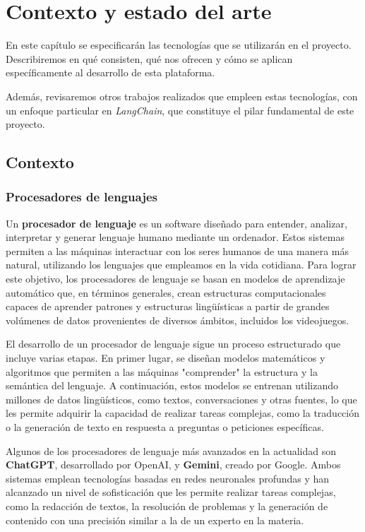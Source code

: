 
\chapter{Contexto y estado del arte }

En este capítulo se especificarán las tecnologías que se utilizarán en el proyecto. Describiremos en qué consisten, qué nos ofrecen y cómo se aplican específicamente al desarrollo de esta plataforma. 

Además, revisaremos otros trabajos realizados que empleen estas tecnologías, con un enfoque particular en \textit{LangChain}, que constituye el pilar fundamental de este proyecto.  

\newpage

\section{Contexto}

\subsection{Procesadores de lenguajes}

Un \textbf{procesador de lenguaje} es un software diseñado para entender, analizar, interpretar y generar lenguaje humano mediante un ordenador. Estos sistemas permiten a las máquinas interactuar con los seres humanos de una manera más natural, utilizando los lenguajes que empleamos en la vida cotidiana. Para lograr este objetivo, los procesadores de lenguaje se basan en modelos de aprendizaje automático que, en términos generales, crean estructuras computacionales capaces de aprender patrones y estructuras lingüísticas a partir de grandes volúmenes de datos provenientes de diversos ámbitos, incluidos los videojuegos.

El desarrollo de un procesador de lenguaje sigue un proceso estructurado que incluye varias etapas. En primer lugar, se diseñan modelos matemáticos y algoritmos que permiten a las máquinas "comprender" la estructura y la semántica del lenguaje. A continuación, estos modelos se entrenan utilizando millones de datos lingüísticos, como textos, conversaciones y otras fuentes, lo que les permite adquirir la capacidad de realizar tareas complejas, como la traducción o la generación de texto en respuesta a preguntas o peticiones específicas.

Algunos de los procesadores de lenguaje más avanzados en la actualidad son \textbf{ChatGPT}, desarrollado por OpenAI, y \textbf{Gemini}, creado por Google. Ambos sistemas emplean tecnologías basadas en redes neuronales profundas y han alcanzado un nivel de sofisticación que les permite realizar tareas complejas, como la redacción de textos, la resolución de problemas y la generación de contenido con una precisión similar a la de un experto en la materia.


